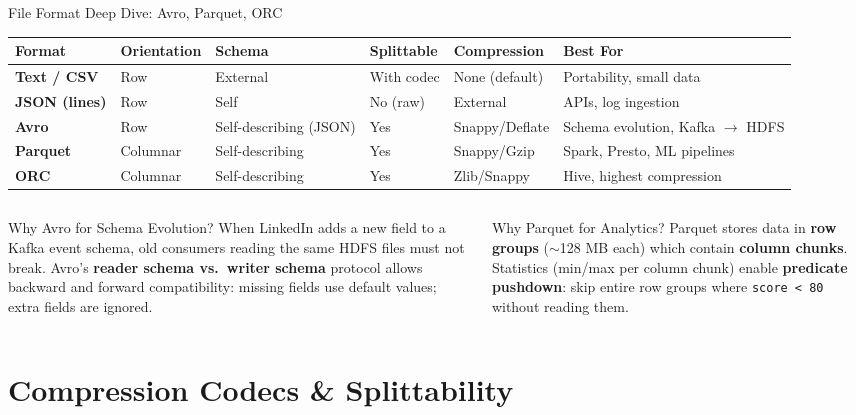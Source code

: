 \documentclass[aspectratio=169,10pt]{beamer}
\begin{document}
\begin{frame}{File Format Deep Dive: Avro, Parquet, ORC}
  \centering
  \renewcommand{\arraystretch}{1.45}
  \begin{tabular}{p{1.6cm}p{1.5cm}p{1.7cm}p{1.5cm}p{1.5cm}p{3.0cm}}
    \toprule
    \textbf{Format} & \textbf{Orientation} & \textbf{Schema} & \textbf{Splittable} & \textbf{Compression} & \textbf{Best For} \\
    \midrule
    \textbf{Text / CSV}
      & Row & External & With codec & None (default) & Portability, small data \\
    \textbf{JSON (lines)}
      & Row & Self & No (raw) & External & APIs, log ingestion \\
    \textbf{Avro}
      & Row & Self-describing (JSON) & Yes & Snappy/Deflate & Schema evolution, Kafka $\to$ HDFS \\
    \textbf{Parquet}
      & Columnar & Self-describing & Yes & Snappy/Gzip & Spark, Presto, ML pipelines \\
    \textbf{ORC}
      & Columnar & Self-describing & Yes & Zlib/Snappy & Hive, highest compression \\
    \bottomrule
  \end{tabular}
  \vspace{8pt}
  \begin{columns}[T]
      \begin{block}{Why Avro for Schema Evolution?}
        \small When LinkedIn adds a new field to a Kafka event schema, old consumers reading the same HDFS files must not break.  Avro's \textbf{reader schema vs.\ writer schema} protocol allows backward and forward compatibility: missing fields use default values; extra fields are ignored.
      \end{block}
      \begin{alertblock}{Why Parquet for Analytics?}
        \small Parquet stores data in \textbf{row groups} ($\sim$128 MB each) which contain \textbf{column chunks}.  Statistics (min/max per column chunk) enable \textbf{predicate pushdown}: skip entire row groups where \texttt{score < 80} without reading them.
      \end{alertblock}
  \end{columns}
\end{frame}

\section{Compression Codecs \& Splittability}
\end{document}

